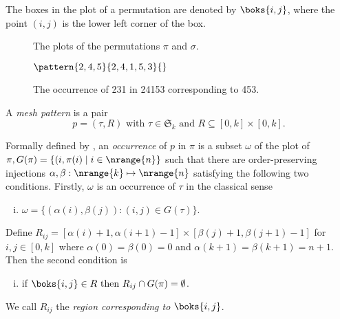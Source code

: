 The boxes in the plot of a permutation are denoted by \(\boks{i,j}\), where the point \((i,j)\) is
the lower left corner of the box.

\begin{figure}[htb]
    \begin{center}
    \raisebox{6ex}{\(G(\pi)=\)}

        \caption{The plots of the permutations \(\pi\) and \(\sigma\).}
        \label{fig:plots}
    \end{center}
\end{figure}

\begin{figure}[htb]
    \begin{center}
    \(\pattern{2,4,5}{2,4,1,5,3}{}\)
        \caption{The occurrence of 231 in 24153 corresponding to 453.}
        \label{fig:containment}
    \end{center}
\end{figure}

\begin{definition}
A \emph{mesh pattern} is a pair
\begin{equation*}
    p = (\tau,R)\text{ with } \tau \in \mathfrak{S}_k \text{ and } R \subseteq [0,k]\times [0,k].
\end{equation*}
\end{definition}

Formally defined by \textcite{journals/combinatorics/BrandenC11},
an \emph{occurrence} of \(p\) in \(\pi\) is a subset \(\omega\) of the plot of
\(\pi, G(\pi) = \{(i,\pi(i)\mid i\in\nrange{n}\}\) such that there are order-preserving
injections \(\alpha,\beta:\nrange{k}\mapsto\nrange{n}\) satisfying the following two conditions.
Firstly, \(\omega\) is an occurrence of \(\tau\) in the classical sense
  \begin{enumerate}[i.]
    \item \(\omega = \{(\alpha(i),\beta(j)):(i,j)\in G(\tau)\}\).
  \end{enumerate}\saveenum
  Define \(R_{ij} = [\alpha(i)+1,\alpha(i+1)-1]\times[\beta(j)+1,\beta(j+1)-1]\)
   for \(i,j\in[0,k]\) where \(\alpha(0)=\beta(0)=0\) and \(\alpha(k+1)=\beta(k+1)=n+1\). Then
   the second condition is
  \begin{enumerate}[i.]\resetenum
  \item if \(\boks{i,j} \in R \text{ then } R_{ij} \cap G(\pi) = \emptyset\).
\end{enumerate}
We call \(R_{ij}\) the \emph{region corresponding to} \(\boks{i,j}\).

